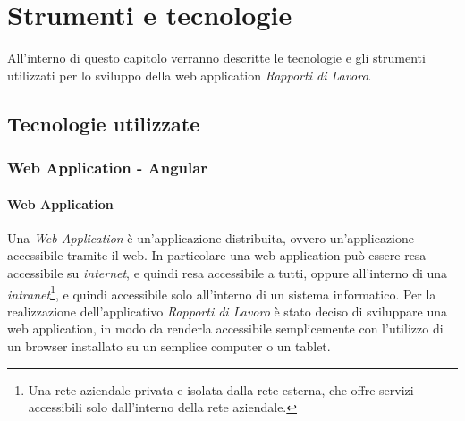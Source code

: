 \chapter{Strumenti e tecnologie}
  \label{chapter_strumenti_tecnologie}
  All'interno di questo capitolo verranno descritte le tecnologie e gli strumenti utilizzati per 
  lo sviluppo della web application \textit{Rapporti di Lavoro}.
  \section{Tecnologie utilizzate}
  \subsection{Web Application - Angular}
  \subsubsection{Web Application}
  Una \textit{Web Application} è un'applicazione distribuita,
  ovvero un'applicazione
  accessibile tramite il web.
  In particolare una web application può essere resa accessibile su \textit{internet}, 
  e quindi resa accessibile a tutti, oppure all'interno di una \textit{intranet}\footnote{Una rete aziendale 
  privata e isolata dalla rete esterna, che offre servizi accessibili solo dall'interno della rete aziendale.}, 
  e quindi accessibile solo all'interno di un sistema informatico. Per la realizzazione dell'applicativo \textit{Rapporti di
  Lavoro} è stato deciso di sviluppare una web application, in modo da renderla accessibile semplicemente con l'utilizzo di un 
  browser installato su un semplice computer o un tablet.\\

